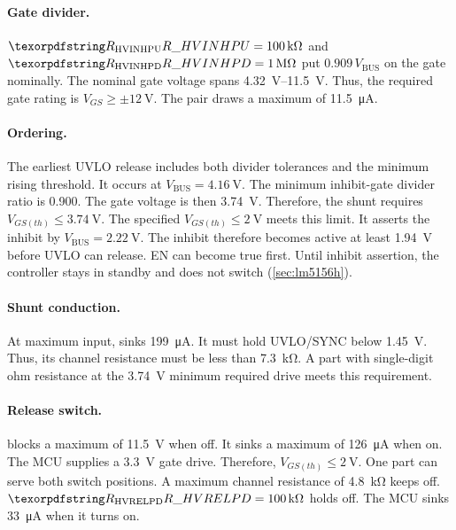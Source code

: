 \paragraph{Gate divider.} $\des{R}{HVINHPU} = \SI{100}{\kilo\ohm}$ and
$\des{R}{HVINHPD} = \SI{1}{\mega\ohm}$ put $0.909\,V_{\mathrm{BUS}}$ on the
gate nominally. The nominal gate voltage spans \SIrange{4.32}{11.5}{\volt}.
Thus, the required
gate rating is $V_{GS} \geq \pm\SI{12}{\volt}$. The pair draws a maximum of
\SI{11.5}{\micro\ampere}.

\paragraph{Ordering.} The earliest UVLO release includes both divider tolerances
and the minimum rising threshold. It occurs at
$V_{\mathrm{BUS}} = \SI{4.16}{\volt}$. The minimum inhibit-gate divider ratio is
0.900. The gate voltage is then \SI{3.74}{\volt}. Therefore, the shunt requires
$V_{GS(th)} \leq \SI{3.74}{\volt}$. The specified
$V_{GS(th)} \leq \SI{2}{\volt}$ meets this limit. It asserts the inhibit by
$V_{\mathrm{BUS}} = \SI{2.22}{\volt}$. The inhibit therefore becomes active at least
\SI{1.94}{\volt} before UVLO can
release. EN can become true first. Until inhibit assertion, the controller stays
in standby and does not switch (\cref{sec:lm5156h}).

\paragraph{Shunt conduction.} At maximum input,  sinks
\SI{199}{\micro\ampere}. It must hold UVLO/SYNC below \SI{1.45}{\volt}. Thus,
its channel resistance must be less than \SI{7.3}{\kilo\ohm}. A part with
single-digit ohm resistance at the \SI{3.74}{\volt} minimum required drive meets this
requirement.

\paragraph{Release switch.}  blocks a maximum of
\SI{11.5}{\volt} when off. It sinks a maximum of \SI{126}{\micro\ampere} when
on. The MCU supplies a \SI{3.3}{\volt} gate drive. Therefore,
$V_{GS(th)} \leq \SI{2}{\volt}$. One part can serve both switch positions. A
maximum channel resistance of \SI{4.8}{\kilo\ohm} keeps  off.
$\des{R}{HVRELPD} = \SI{100}{\kilo\ohm}$ holds  off. The MCU
sinks \SI{33}{\micro\ampere} when it turns  on.


